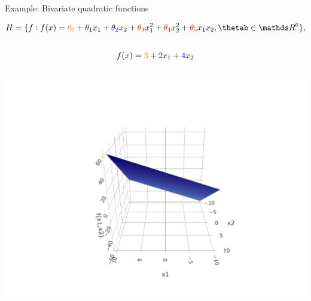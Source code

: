 \documentclass[11pt,compress,t,notes=noshow, xcolor=table]{beamer}
\begin{document}
\begin{vbframe}{Example: Bivariate quadratic functions}

\begin{equation*}
    \Hspace = \{f: \fx =  
    \textcolor{orange}{\theta_0} + \textcolor{blue}{\theta_1} x_1 + 
    \textcolor{blue}{\theta_2} x_2 + \textcolor{red}{\theta_3} x_1^2 + 
    \textcolor{red}{\theta_4} x_2^2 + \textcolor{red}{\theta_5} x_1 x_2, 
    \thetab \in \R^6\},
\end{equation*}


\vspace*{-\baselineskip}

\begin{columns}

  \tiny

  \begin{column}{0.33\textwidth}
    \begin{center}
      \begin{equation*}
        \begin{split}
          f(x) &= \textcolor{orange}{3} + \textcolor{blue}{2} x_1 + 
          \textcolor{blue}{4} x_2 \\
          \textcolor{white}{x} 
        \end{split}
      \end{equation*}
      \vspace*{-1.5\baselineskip}
      \includegraphics[trim = 100 10 100 50, clip, 
      width = \textwidth]{figure/hs-quadric-1.pdf}
    \end{center}
  \end{column}
  

\end{columns}
\end{vbframe}
\end{document}
